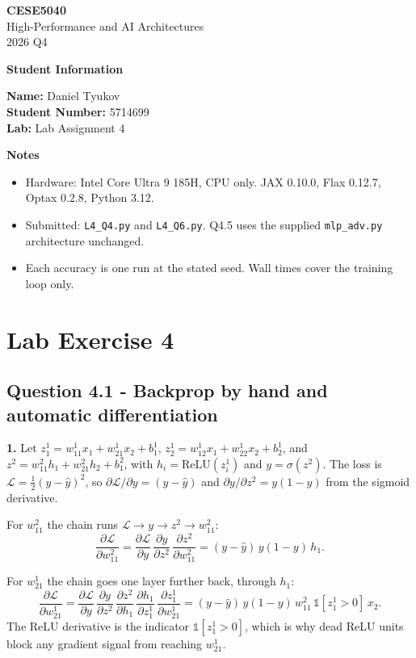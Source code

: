 \documentclass[11pt,a4paper]{article}
\newcommand{\courseheader}{
    \begin{center}
        {\sffamily\Large\bfseries CESE5040}\\[0.3em]
        {\sffamily High-Performance and AI Architectures}\\
        {\color{lightgray}2026 Q4}
    \end{center}
}
\newcommand{\Q}[1]{\subsection*{Question #1}}
\newcommand{\Qpart}[1]{\textbf{#1.}}
\begin{document}
\courseheader
\vspace{1em}

{\color{headingcolor}\sffamily\large\bfseries Student Information}

\textbf{Name:} Daniel Tyukov\\
\textbf{Student Number:} 5714699\\
\textbf{Lab:} Lab Assignment 4

{\color{headingcolor}\sffamily\large\bfseries Notes}

\begin{itemize}\setlength\itemsep{0.1em}
    \item Hardware: Intel Core Ultra 9 185H, CPU only. JAX 0.10.0, Flax 0.12.7, Optax 0.2.8, Python 3.12.
    \item Submitted: \texttt{L4\_Q4.py} and \texttt{L4\_Q6.py}. Q4.5 uses the supplied \texttt{mlp\_adv.py} architecture unchanged.
    \item Each accuracy is one run at the stated seed. Wall times cover the training loop only.
\end{itemize}

\vspace{0.5em}

\section*{\color{headingcolor}Lab Exercise 4}

\Q{4.1 - Backprop by hand and automatic differentiation}

\Qpart{1} Let $z^1_1 = w^1_{11}x_1 + w^1_{21}x_2 + b^1_1$, $z^1_2 = w^1_{12}x_1 + w^1_{22}x_2 + b^1_2$, and $z^2 = w^2_{11}h_1 + w^2_{21}h_2 + b^2_1$, with $h_i = \mathrm{ReLU}(z^1_i)$ and $y = \sigma(z^2)$. The loss is $\mathcal{L} = \tfrac{1}{2}(y - \hat{y})^2$, so $\partial \mathcal{L} / \partial y = (y - \hat{y})$ and $\partial y / \partial z^2 = y(1-y)$ from the sigmoid derivative.

For $w^2_{11}$ the chain runs $\mathcal{L} \to y \to z^2 \to w^2_{11}$:
\[
\frac{\partial \mathcal{L}}{\partial w^2_{11}}
= \frac{\partial \mathcal{L}}{\partial y}\,\frac{\partial y}{\partial z^2}\,\frac{\partial z^2}{\partial w^2_{11}}
= (y - \hat{y})\,y(1-y)\,h_1.
\]

For $w^1_{21}$ the chain goes one layer further back, through $h_1$:
\[
\frac{\partial \mathcal{L}}{\partial w^1_{21}}
= \frac{\partial \mathcal{L}}{\partial y}\,\frac{\partial y}{\partial z^2}\,\frac{\partial z^2}{\partial h_1}\,\frac{\partial h_1}{\partial z^1_1}\,\frac{\partial z^1_1}{\partial w^1_{21}}
= (y - \hat{y})\,y(1-y)\,w^2_{11}\,\mathbb{1}[z^1_1 > 0]\,x_2.
\]
The ReLU derivative is the indicator $\mathbb{1}[z^1_1 > 0]$, which is why dead ReLU units block any gradient signal from reaching $w^1_{21}$.
\end{document}

